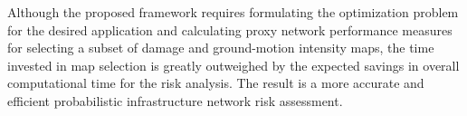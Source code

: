 Although the proposed framework requires formulating the optimization problem for the desired application and calculating proxy network performance measures for selecting a subset of damage and ground-motion intensity maps, the time invested in map selection is greatly outweighed by the expected savings in overall computational time for the risk analysis. The result is a more accurate and efficient probabilistic infrastructure network risk assessment.




